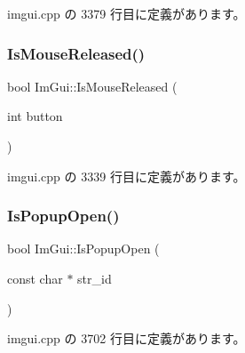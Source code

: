  imgui.\+cpp の 3379 行目に定義があります。

\mbox{\label{namespace_im_gui_aef586112e8d1eb26ce28198d9efe9bba}} 
\subsubsection{\texorpdfstring{Is\+Mouse\+Released()}{IsMouseReleased()}}
{\footnotesize\ttfamily bool Im\+Gui\+::\+Is\+Mouse\+Released (\begin{DoxyParamCaption}\item[{int}]{button }\end{DoxyParamCaption})}



 imgui.\+cpp の 3339 行目に定義があります。

\mbox{\label{namespace_im_gui_a8f25c1565fca7cb9796c54e5cebc44ee}} 
\subsubsection{\texorpdfstring{Is\+Popup\+Open()}{IsPopupOpen()}\hspace{0.1cm}{\footnotesize\ttfamily [1/2]}}
{\footnotesize\ttfamily bool Im\+Gui\+::\+Is\+Popup\+Open (\begin{DoxyParamCaption}\item[{const char $\ast$}]{str\+\_\+id }\end{DoxyParamCaption})}



 imgui.\+cpp の 3702 行目に定義があります。

